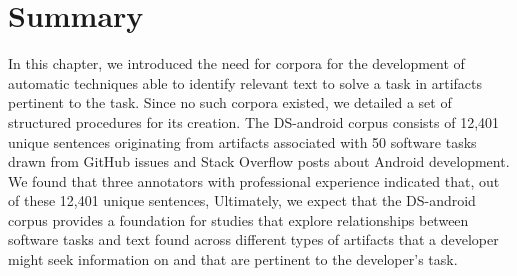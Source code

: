 
\section{Summary}
\label{cp4:corpus-summary}

In this chapter, we introduced the need for corpora 
for the development of 
automatic techniques able to identify relevant text
to solve a task in artifacts
pertinent to the task.
Since  no such corpora
existed, we detailed 
a set of structured procedures for its creation. 
The \acs{DS-android} corpus consists of  
12,401 unique sentences
originating from artifacts associated with 50 software tasks
drawn from GitHub issues and Stack Overflow posts about Android development. 
We found that 
three annotators with professional experience indicated that,
out of these 12,401 unique sentences, 
Ultimately, we expect that the \acs{DS-android} corpus
provides a foundation for studies that explore relationships between software tasks and text found across different types of artifacts that a developer might seek information on and that are pertinent to the developer's task.
 
